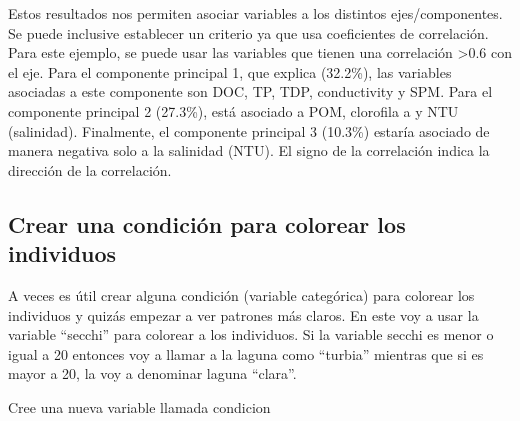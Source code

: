 \documentclass[
]{book}
\newenvironment{Shaded}{\begin{snugshade}}{\end{snugshade}}
\newcommand{\AttributeTok}[1]{\textcolor[rgb]{0.77,0.63,0.00}{#1}}
\newcommand{\ConstantTok}[1]{\textcolor[rgb]{0.00,0.00,0.00}{#1}}
\newcommand{\DecValTok}[1]{\textcolor[rgb]{0.00,0.00,0.81}{#1}}
\newcommand{\FunctionTok}[1]{\textcolor[rgb]{0.00,0.00,0.00}{#1}}
\newcommand{\NormalTok}[1]{#1}
\newcommand{\OtherTok}[1]{\textcolor[rgb]{0.56,0.35,0.01}{#1}}
\newcommand{\SpecialCharTok}[1]{\textcolor[rgb]{0.00,0.00,0.00}{#1}}
\newcommand{\StringTok}[1]{\textcolor[rgb]{0.31,0.60,0.02}{#1}}
\begin{document}
Estos resultados nos permiten asociar variables a los distintos ejes/componentes. Se puede inclusive establecer un criterio ya que usa coeficientes de correlación. Para este ejemplo, se puede usar las variables que tienen una correlación \textgreater0.6 con el eje. Para el componente principal 1, que explica (32.2\%), las variables asociadas a este componente son DOC, TP, TDP, conductivity y SPM. Para el componente principal 2 (27.3\%), está asociado a POM, clorofila a y NTU (salinidad). Finalmente, el componente principal 3 (10.3\%) estaría asociado de manera negativa solo a la salinidad (NTU). El signo de la correlación indica la dirección de la correlación.

\hypertarget{crear-una-condiciuxf3n-para-colorear-los-individuos}{%
\subsection{Crear una condición para colorear los individuos}\label{crear-una-condiciuxf3n-para-colorear-los-individuos}}

A veces es útil crear alguna condición (variable categórica) para colorear los individuos y quizás empezar a ver patrones más claros. En este voy a usar la variable ``secchi'' para colorear a los individuos. Si la variable secchi es menor o igual a 20 entonces voy a llamar a la laguna como ``turbia'' mientras que si es mayor a 20, la voy a denominar laguna ``clara''.

\begin{Shaded}
\end{Shaded}

Cree una nueva variable llamada condicion

\begin{Shaded}
\end{Shaded}
\end{document}
